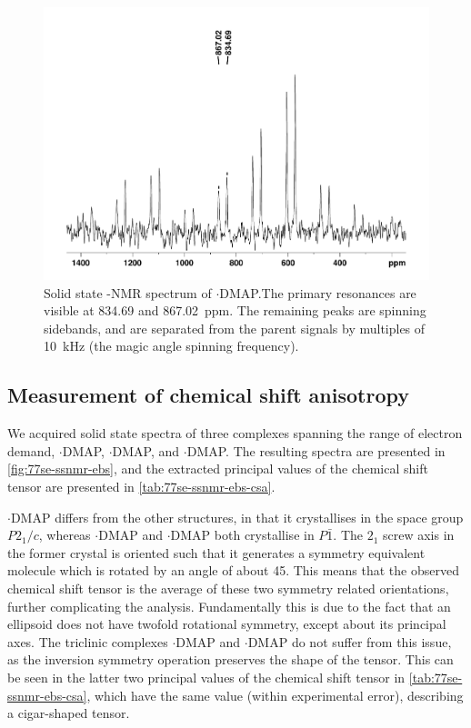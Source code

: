 \begin{refsection}
\begin{figure}
    \centering
    \includegraphics[width=0.7\linewidth]{Figures/ebs-4ome-dmap-cpmas-77se.pdf}
    \caption[Solid state -NMR spectrum of $ \cdot $DMAP.]{Solid state -NMR spectrum of $ \cdot $DMAP.\@ The primary resonances are visible at 834.69 and 867.02~ppm. The remaining peaks are spinning sidebands, and are separated from the parent signals by multiples of 10~kHz (the magic angle spinning frequency).}\label{fig:cpmas-sol-77se}
\end{figure}

\subsection{Measurement of chemical shift anisotropy}
We acquired solid state spectra of three complexes spanning the range of electron demand, $ \cdot $DMAP, $ \cdot $DMAP, and $ \cdot $DMAP.\@
The resulting spectra are presented in \cref{fig:77se-ssnmr-ebs}, and the extracted principal values of the chemical shift tensor are presented in \cref{tab:77se-ssnmr-ebs-csa}.

$ \cdot $DMAP differs from the other structures, in that it crystallises in the space group $P2_1/c$, whereas $ \cdot $DMAP and $ \cdot $DMAP both crystallise in $P\bar{1}$.
The $2_1$ screw axis in the former crystal is oriented such that it generates a symmetry equivalent molecule which is rotated by an angle of about 45\degree.
This means that the observed chemical shift tensor is the average of these two symmetry related orientations, further complicating the analysis.
Fundamentally this is due to the fact that an ellipsoid does not have twofold rotational symmetry, except about its principal axes.
The triclinic complexes $ \cdot $DMAP and $ \cdot $DMAP do not suffer from this issue, as the inversion symmetry operation preserves the shape of the tensor.
This can be seen in the latter two principal values of the chemical shift tensor in \cref{tab:77se-ssnmr-ebs-csa}, which have the same value (within experimental error), describing a cigar-shaped tensor.


\end{refsection}
